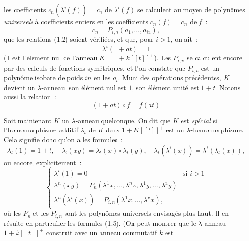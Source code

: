 les
coefficients $c_n(\lambda^i(f))=c_n\text{ de }\lambda^i(f)$ se calculent au moyen de polynômes \emph{universels} à coefficients entiers en les coefficients $c_n(f)=a_n$ de $f$~:
\begin{equation}\tag{1.8}
c_n=P_{i,n}(a_1,\ldots,a_{in}),
\end{equation}
que les relations (1.2) soient vérifiées, et que, pour $i>1$, on ait~:
\begin{equation}\tag{1.9}
\lambda^i(1+at)=1
\end{equation}
($1$ est l'élément nul de l'anneau $K=1+k[[t]]^+$). Les $P_{i,n}$ se calculent encore par des calculs de fonctions symétriques, et l'on constate que $P_{i,n}$ est un polynôme isobare de poids $in$ en les $a_i$. Muni des opérations précédentes, $K$ devient un $\lambda$-anneau, son élément nul est $1$, son élément unité est $1+t$. Notons aussi la relation~:
\begin{equation}\tag{1.7 bis}
(1+at)\circ f=f(at)
\end{equation}

Soit maintenant $K$ un $\lambda$-anneau quelconque. On dit que $K$ est \emph{spécial} si l'homomorphisme additif $\lambda_t$ de $K$ dans $1+K[[t]]^+$ est un $\lambda$-homomorphisme. Cela signifie donc qu'on a les formules~:
\begin{equation}\tag{1.10}
\lambda_t(1)=1+t,\quad
\lambda_t(xy)=\lambda_t(x)\circ\lambda_t(y),\quad
\lambda_t(\lambda^i(x))=\lambda^i(\lambda_t(x)),
\end{equation}
ou encore, explicitement~:
\begin{equation}\tag{1.11}
\begin{cases}
\lambda^i(1)=0 & \text{si }i>1\\
\lambda^n(xy)=P_n(\lambda^1x,\ldots,\lambda^n x;\lambda^1y,\ldots,\lambda^n y)\\
\lambda^n(\lambda^i(x))=P_{i,n}(\lambda^1x,\ldots,\lambda^n x),
\end{cases}
\end{equation}
où les $P_n$ et les $P_{i,n}$ sont les polynômes universels envisagés plus haut. Il en résulte en particulier les formules (1.5). (On peut montrer que le $\lambda$-anneau $1+k[[t]]^+$ construit avec un anneau commutatif $k$ est
